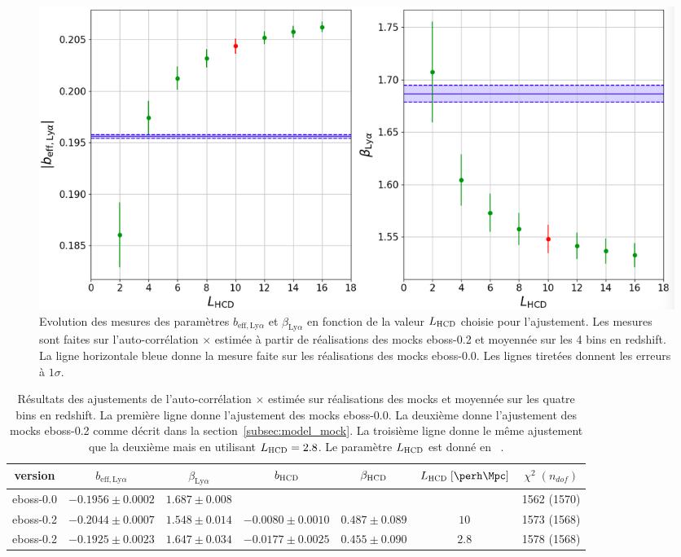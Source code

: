 \documentclass[11pt, twoside, a4paper, openright]{report}
\begin{document}
\begin{figure}
  \centering
  \includegraphics[scale=0.33]{bias_lya_vs_L0}
  \caption{Evolution des mesures des paramètres $b_{\mathrm{eff},\mathrm{Ly}\alpha}$ et $\beta_{\mathrm{Ly}\alpha}$ en fonction de la valeur $L_{\textsc{HCD}}$ choisie pour l'ajustement.
    Les mesures sont faites sur l'auto-corrélation \lya{}$\times$\lya{} estimée à partir de \Nmocks{} réalisations des mocks eboss-0.2 et moyennée sur les 4 bins en redshift. La ligne horizontale bleue donne la mesure faite sur les \Nmocks réalisations des mocks eboss-0.0. Les lignes tiretées donnent les erreurs à $1 \sigma$.}
  \label{fig:bias_lya_vs_L0}
\end{figure}

\begin{table}[]
  \centering
  \caption{Résultats des ajustements de l'auto-corrélation \lya{}$\times$\lya{} estimée sur \Nmocks réalisations des mocks et moyennée sur les quatre bins en redshift. La première ligne donne l'ajustement des mocks eboss-0.0. La deuxième donne l'ajustement des mocks eboss-0.2 comme décrit dans la section~\ref{subsec:model_mock}. La troisième ligne donne le même ajustement que la deuxième mais en utilisant $L_{\textsc{HCD}} = \num{2.8}$. Le paramètre $L_{\textsc{HCD}}$ est donné en \si{\perh\Mpc}.}
  \label{tab:cf_eboss02_L028}
  \footnotesize
  \begin{tabular}{ccccccc}
    \toprule
    version & $b_{\mathrm{eff},\mathrm{Ly}\alpha}$ & $\beta_{\mathrm{Ly}\alpha}$ & $b_{\textsc{HCD}}$ & $\beta_{\textsc{HCD}}$ & $L_{\textsc{HCD}}\;[\si{\perh\Mpc}]$ & $\chi^2 \; (n_{dof})$ \\
    \midrule
    eboss-0.0 & $-0.1956 \pm 0.0002$ & $1.687 \pm 0.008$ & & & & 1562 (1570) \\
    eboss-0.2 & $-0.2044 \pm 0.0007$ & $1.548 \pm 0.014$ & $-0.0080 \pm 0.0010$ & $0.487 \pm 0.089$ & $10$ & 1573 (1568) \\
    eboss-0.2 & $-0.1925 \pm 0.0023$ & $ 1.647 \pm 0.034$ &  $-0.0177 \pm 0.0025$ & $ 0.455 \pm 0.090$ & $2.8$ & 1578 (1568) \\ 
    \bottomrule
  \end{tabular}
\end{table}
\end{document}
